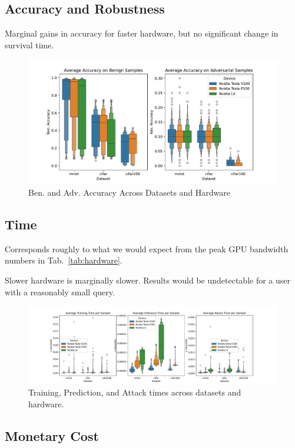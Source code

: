 \documentclass[conference]{IEEEtran}
\begin{document}
\subsection{Accuracy and Robustness}
Marginal gains in accuracy for faster hardware, but no significant change in survival time.
\begin{figure}
    \centering
    \includegraphics[width=\textwidth]{plots/combined/acc.pdf}
    \caption{Ben. and Adv. Accuracy Across Datasets and Hardware}
    \label{fig:acc}
\end{figure}

\subsection{Time}
Corresponds roughly to what we would expect from the peak GPU bandwidth numbers in Tab.~\ref{tab:hardware}.

Slower hardware is marginally slower. Results would be undetectable for a user with a reasonably small query.


\begin{figure}
    \centering
    \includegraphics[width=\textwidth]{plots/combined/time.pdf}
    \caption{Training, Prediction, and Attack times across datasets and hardware.}
    \label{fig:time}
\end{figure}





\subsection{Monetary Cost}
\end{document}
